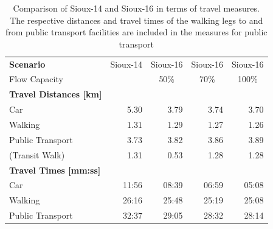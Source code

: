 \begin{table}[ht]
\centering
\caption{Comparison of Sioux-14 and Sioux-16 in terms of travel measures. The respective
distances and travel times of the walking legs to and from public transport facilities
are included in the measures for public transport}
\label{tab:sioux}
\begin{tabular}{@{}lrrrr@{}}
\toprule
\textbf{Scenario}                  & \multicolumn{1}{c}{Sioux-14} & \multicolumn{1}{c}{Sioux-16} & \multicolumn{1}{c}{Sioux-16} & \multicolumn{1}{c}{Sioux-16} \\
Flow Capacity                      & \multicolumn{1}{c}{}         & \multicolumn{1}{c}{50\%}     & \multicolumn{1}{c}{70\%}     & \multicolumn{1}{c}{100\%}    \\ \midrule
\textbf{Travel Distances {[}km{]}} & \multicolumn{1}{l}{}         & \multicolumn{1}{l}{}         & \multicolumn{1}{l}{}         & \multicolumn{1}{l}{}         \\
Car                                & 5.30                         & 3.79                         & 3.74                         & 3.70                         \\
Walking                            & 1.31                         & 1.29                         & 1.27                         & 1.26                         \\
Public Transport                   & 3.73                         & 3.82                         & 3.86                         & 3.89                         \\
(Transit Walk)                     & 1.31                         & 0.53                         & 1.28                         & 1.28                         \\\midrule
\textbf{Travel Times {[}mm:ss{]}}  & \multicolumn{1}{l}{}         & \multicolumn{1}{l}{}         & \multicolumn{1}{l}{}         & \multicolumn{1}{l}{}         \\
Car                                & 11:56                        & 08:39                        & 06:59                        & 05:08                        \\
Walking                            & 26:16                        & 25:48                        & 25:19                        & 25:08                        \\
Public Transport                   & 32:37                        & 29:05                        & 28:32                        & 28:14                        \\

\end{tabular}
\end{table}
